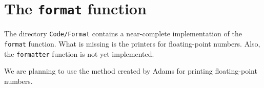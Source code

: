 \chapter{The \texttt{format} function}

The directory \texttt{Code/Format} contains a near-complete
implementation of the \texttt{format} function.  What is missing is
the printers for floating-point numbers.  Also, the \texttt{formatter}
function is not yet implemented.

We are planning to use the method created by Adams
\cite{Adams:2018:RFF:3296979.3192369} for printing floating-point
numbers.
